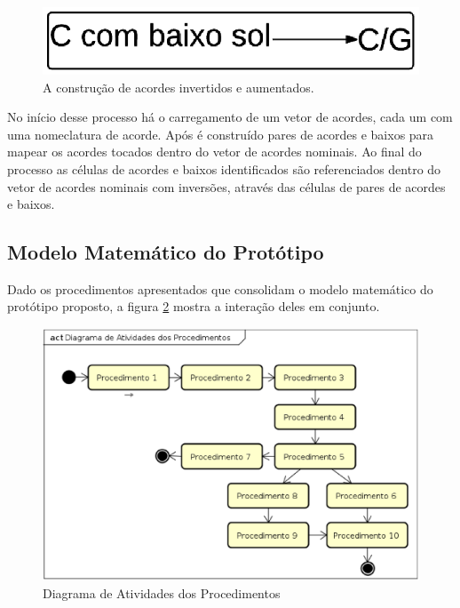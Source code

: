 \begin{figure}[h] 
  \centering
    \includegraphics[keepaspectratio=true, scale=0.55]{figuras/procedimento_10}
    \caption{A construção de acordes invertidos e aumentados.}
    \label{fig:procedimento_10}
\end{figure}

No início desse processo há o carregamento de um vetor de acordes, cada um com uma nomeclatura de acorde. Após é construído pares de acordes e baixos para mapear os acordes tocados dentro do vetor de acordes nominais. Ao final do processo as células de acordes e baixos identificados são referenciados dentro do vetor de acordes nominais com inversões, através das células de pares de acordes e baixos.

\newpage
\subsection{Modelo Matemático do Protótipo}

Dado os procedimentos apresentados que consolidam o modelo matemático do protótipo proposto, a figura \ref{fig:atividades_2} mostra a interação deles em conjunto.

\begin{figure}[h]
	\centering
		\includegraphics[keepaspectratio=true,scale=0.45]{figuras/diagrama_atividades_2.eps}
	\caption{Diagrama de Atividades dos Procedimentos}
	\label{fig:atividades_2}
\end{figure}

